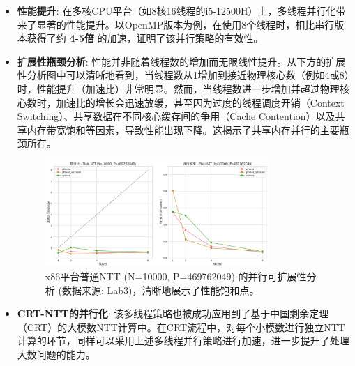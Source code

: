 \documentclass[a4paper]{article}
\begin{document}
\begin{itemize}
\begin{itemize}
        \item \textbf{性能提升}: 在多核CPU平台（如8核16线程的i5-12500H）上，多线程并行化带来了显著的性能提升。以OpenMP版本为例，在使用8个线程时，相比串行版本获得了约 \textbf{4-5倍} 的加速，证明了该并行策略的有效性。
        \item \textbf{扩展性瓶颈分析}: 性能并非随着线程数的增加而无限线性提升。从下方的扩展性分析图中可以清晰地看到，当线程数从1增加到接近物理核心数（例如4或8）时，性能提升（加速比）非常明显。然而，当线程数进一步增加并超过物理核心数时，加速比的增长会迅速放缓，甚至因为过度的线程调度开销（Context Switching）、共享数据在不同核心缓存间的争用（Cache Contention）以及共享内存带宽饱和等因素，导致性能出现下降。这揭示了共享内存并行的主要瓶颈所在。
        \begin{figure}[H]
            \centering
            \includegraphics[width=0.8\textwidth]{fig/scalability_charts_plain_N10000_P469762049_chinese.png}
            \caption{x86平台普通NTT (N=10000, P=469762049) 的并行可扩展性分析 (数据来源: Lab3)，清晰地展示了性能饱和点。}
            \label{fig:pthread_scalability}
        \end{figure}
        \item \textbf{CRT-NTT的并行化}: 该多线程策略也被成功应用到了基于中国剩余定理（CRT）的大模数NTT计算中。在CRT流程中，对每个小模数进行独立NTT计算的环节，同样可以采用上述多线程并行策略进行加速，进一步提升了处理大数问题的能力。
    \end{itemize}
\end{itemize}
\end{document}
